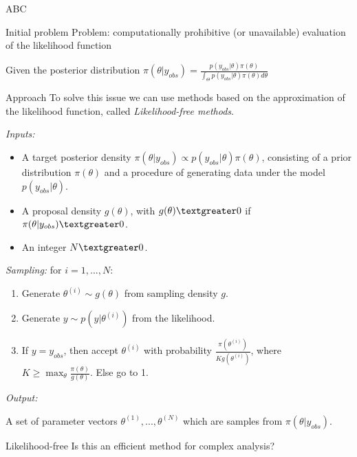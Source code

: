 \documentclass{beamer}
\theoremstyle{plain}
\begin{document}
\begin{section}{ABC}
\begin{frame}{Initial problem}
	Problem: computationally prohibitive (or unavailable) evaluation of the likelihood function
	
	\vspace{1cm}
	Given the posterior distribution $\pi(\theta | y_{obs}) = \frac{p(y_{obs}|\theta) \pi(\theta)}{\int _{\Theta }p(y_{obs}|\theta) \pi(\theta) d\theta }$ 
\end{frame}

\begin{frame}{Approach}
	To solve this issue we can use methods based on the approximation of the likelihood function, called \textit{Likelihood-free methods}.
	\vspace{0.2cm}
	
	\emph{Inputs:}
	\begin{itemize}
		\item A target posterior density $\pi(\theta | y_{obs}) \propto p(y_{obs}|\theta) \pi(\theta)$, consisting of a prior distribution $\pi(\theta)$ and a procedure of generating data under the model $p(y_{obs}|\theta)$.
		\item A proposal density $g(\theta)$, with $g(\theta)\textgreater 0 $ if $\pi(\theta | y_{obs}) \textgreater 0$.
		\item An integer $N \textgreater0$.
	\end{itemize}
	\emph{Sampling:} for $i= 1,..., N$:
	\begin{enumerate}
		\item Generate $\theta ^ {(i)} \sim g(\theta)$ from sampling density $g$.
		\item Generate $ y \sim p(y|\theta ^ {(i)})$ from the likelihood.
		\item If $y=y_{obs}$, then accept $\theta ^ {(i)}$ with probability $\frac{\pi(\theta ^ {(i)})}{K g(\theta ^ {(i)})}$, where $K \geq \max_{\theta}{\frac{\pi(\theta)}{g(\theta)}}$. Else go to 1.
	\end{enumerate}
	\emph{Output:}
	
	A set of parameter vectors $\theta ^ {(1)},..., \theta ^ {(N)}$ which are samples from $\pi(\theta |y_{obs})$.
	
	

\end{frame}

\begin{frame}{Likelihood-free}
	Is this an efficient method for complex analysis?
	

\end{frame}
\end{section}
\end{document}
